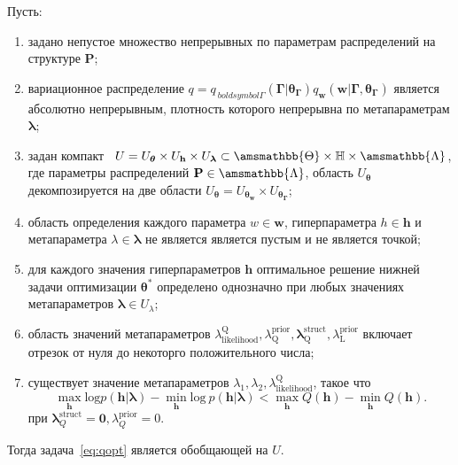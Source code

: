 \begin{theorem}
Пусть:
\begin{enumerate} 
\item задано непустое множество непрерывных по параметрам распределений на структуре $\mathbf{P}$;

\item вариационное распределение $q = q_{\  boldsymbol{\Gamma}}(\boldsymbol{\Gamma}|\boldsymbol{\theta}_{\boldsymbol{\Gamma}}) q_{\mathbf{w}}(\mathbf{w}| \boldsymbol{\Gamma},\boldsymbol{\theta}_{\boldsymbol{\Gamma}})$ является  абсолютно непрерывным, плотность которого непрерывна по метапараметрам $\boldsymbol{\lambda}$;

\item задан компакт  $U = U_{\boldsymbol{\theta}} \times U_{\mathbf{h}} \times U_{\boldsymbol{\lambda}} \subset \amsmathbb{\Theta} \times \mathbb{H} \times \amsmathbb{\Lambda}$, где параметры распределений $\mathbf{P} \in \amsmathbb{\Lambda}$, область $U_{\boldsymbol{\theta}}$ декомпозируется на две области $U_{\boldsymbol{\theta}} = U_{\boldsymbol{\theta}_{\mathbf{w}}} \times U_{\boldsymbol{\theta}_{\boldsymbol{\Gamma}}}$;

\item область определения каждого параметра $w \in \mathbf{w}$, гиперпараметра $h \in \mathbf{h}$ и метапараметра $\lambda \in \boldsymbol{\lambda}$ не является является пустым и не является точкой;

\item для каждого значения гиперпараметров $\mathbf{h}$ оптимальное решение нижней задачи оптимизации $\boldsymbol{\theta}^{*}$ определено однозначно при любых значениях метапараметров $\boldsymbol{\lambda} \in U_{\lambda}$;

\item область значений метапараметров $\lambda_\text{likelihood}^\text{Q}, \lambda^\text{prior}_\text{Q}, \boldsymbol{\lambda}^\text{struct}_\text{Q}, \lambda^\text{prior}_\text{L}$ включает отрезок от нуля до некоторго положительного числа;

\item существует значение метапараметров $\lambda_1, \lambda_2, \lambda_\text{likelihood}^\text{Q}$, такое что
\[
\max_{\mathbf{h}} \text{log} p (\mathbf{h}|\boldsymbol{\lambda})-\min_{\mathbf{h}} \text{log}~p(\mathbf{h}|\boldsymbol{\lambda}) < \max_{\mathbf{h}} Q(\mathbf{h}) -  \min_{\mathbf{h}} Q(\mathbf{h}).
\] 
при $\boldsymbol{\lambda}^\text{struct}_Q = \mathbf{0}, \lambda^\text{prior}_Q = 0$.

\end{enumerate}
Тогда задача~\eqref{eq:qopt} является обобщающей на $U$.
\end{theorem}
